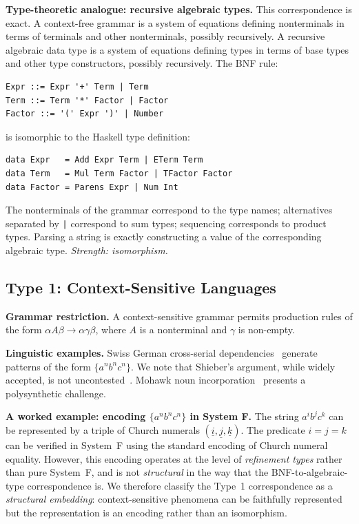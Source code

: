 \documentclass[12pt,a4paper]{article}
\begin{document}
\textbf{Type-theoretic analogue: recursive algebraic types.} This
correspondence is exact. A context-free grammar is a system of equations
defining nonterminals in terms of terminals and other nonterminals, possibly
recursively. A recursive algebraic data type is a system of equations defining
types in terms of base types and other type constructors, possibly recursively.
The BNF rule:

\begin{verbatim}
Expr ::= Expr '+' Term | Term
Term ::= Term '*' Factor | Factor
Factor ::= '(' Expr ')' | Number
\end{verbatim}

\noindent is isomorphic to the Haskell type definition:

\begin{verbatim}
data Expr   = Add Expr Term | ETerm Term
data Term   = Mul Term Factor | TFactor Factor
data Factor = Parens Expr | Num Int
\end{verbatim}

The nonterminals of the grammar correspond to the type names; alternatives
separated by \texttt{|} correspond to sum types; sequencing corresponds to
product types. Parsing a string is exactly constructing a value of the
corresponding algebraic type. \emph{Strength: isomorphism.}

\subsection{Type 1: Context-Sensitive Languages}

\textbf{Grammar restriction.} A context-sensitive grammar permits production
rules of the form $\alpha A \beta \to \alpha \gamma \beta$, where $A$ is a
nonterminal and $\gamma$ is non-empty.

\textbf{Linguistic examples.} Swiss German cross-serial
dependencies~\cite{Shieber1985} generate patterns of the form
$\{a^n b^n c^n\}$. We note that Shieber's argument, while widely accepted, is
not uncontested~\cite{PullumGazdar1982,MichaelisKracht1997}. Mohawk noun
incorporation~\cite{Baker1988,Baker1996} presents a polysynthetic challenge.

\textbf{A worked example: encoding $\{a^n b^n c^n\}$ in System F.} The
string $a^i b^j c^k$ can be represented by a triple of Church numerals
$(\underline{i}, \underline{j}, \underline{k})$. The predicate $i = j = k$
can be verified in System~F using the standard encoding of Church numeral
equality. However, this encoding operates at the level of \emph{refinement
types} rather than pure System~F, and is not \emph{structural} in the way
that the BNF-to-algebraic-type correspondence is. We therefore classify the
Type~1 correspondence as a \emph{structural embedding}: context-sensitive
phenomena can be faithfully represented but the representation is an encoding
rather than an isomorphism.
\end{document}
